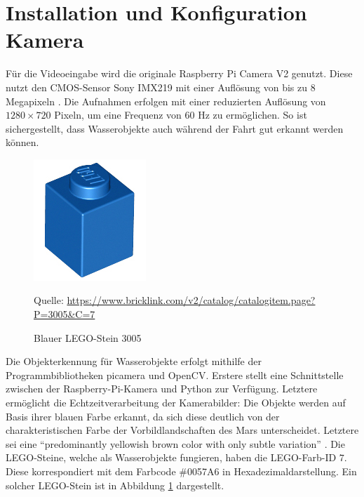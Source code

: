 \section{Installation und Konfiguration Kamera}
\label{sec:inst_konf_kamera}

Für die Videoeingabe wird die originale Raspberry Pi Camera V2 genutzt.
Diese nutzt den CMOS-Sensor Sony IMX219 mit einer Auflösung von bis zu 8 Megapixeln \cite{pagnutti2017}.
Die Aufnahmen erfolgen mit einer reduzierten Auflösung von $1280 \times 720$ Pixeln, um eine Frequenz von 60 Hz zu ermöglichen. 
So ist sichergestellt, dass Wasserobjekte auch während der Fahrt gut erkannt werden können.


\begin{figure}
	\centering
	\includegraphics[width=0.9\linewidth]{../Images/3005.png}
	\vspace{0.5em}
	\parbox[c]{0.8\linewidth}{\footnotesize
		\centering
		\vspace{1em}
		Quelle: \url{https://www.bricklink.com/v2/catalog/catalogitem.page?P=3005\&C=7}
	}
	\captionsetup{format=plain}
	\caption{Blauer LEGO-Stein 3005}
	\label{fig:lego3005}
\end{figure}

Die Objekterkennung für Wasserobjekte erfolgt mithilfe der Programmbibliotheken picamera und OpenCV.
Erstere stellt eine Schnittstelle zwischen der Raspberry-Pi-Kamera und Python zur Verfügung.
Letztere ermöglicht die Echtzeitverarbeitung der Kamerabilder:
Die Objekte werden auf Basis ihrer blauen Farbe erkannt, da sich diese deutlich von der charakteristischen Farbe der Vorbildlandschaften des Mars unterscheidet.
Letztere sei eine \enquote{predominantly yellowish brown color with only subtle variation} \cite{maki1999}.
Die LEGO-Steine, welche als Wasserobjekte fungieren, haben die LEGO-Farb-ID $7$.
Diese korrespondiert mit dem Farbcode \#0057A6 in Hexadezimaldarstellung.
Ein solcher LEGO-Stein ist in Abbildung \ref{fig:lego3005} dargestellt.

